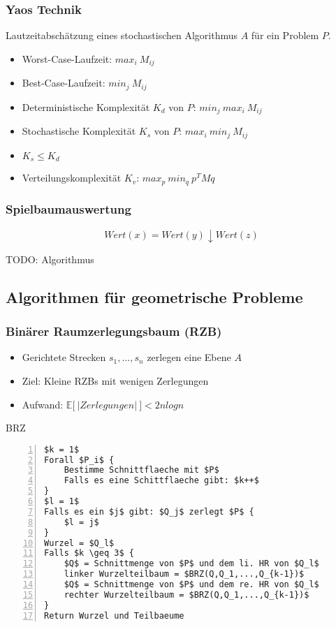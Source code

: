 \subsubsection{Yaos Technik}
Lautzeitabschätzung eines stochastischen Algorithmus \(A\) für ein Problem \(P\).
\begin{itemize}
	\item Worst-Case-Laufzeit: \(max_i~M_{ij}\)
	\item Best-Case-Laufzeit: \(min_j~M_{ij}\)
	\item Deterministische Komplexität \(K_d\) von \(P\): \(min_j~max_i~M_{ij}\)
	\item Stochastische Komplexität \(K_s\) von \(P\): \(max_i~min_j~M_{ij}\)
	\item \(K_s \leq K_d\) 
	\item Verteilungskomplexität \(K_v\): \(max_p~min_q~p^TMq\)
\end{itemize}

\subsubsection{Spielbaumauswertung}
\[Wert(x) = Wert(y) \downarrow Wert(z)\]

TODO: Algorithmus


\subsection{Algorithmen für geometrische Probleme}

\subsubsection{Binärer Raumzerlegungsbaum (RZB)}
\begin{itemize}
	\item Gerichtete Strecken \(s_1,...,s_n\) zerlegen eine Ebene \(A\)
	\item Ziel: Kleine RZBs mit wenigen Zerlegungen
	\item Aufwand: \(\mathbb{E} \lbrack~|Zerlegungen|~\rbrack < 2nlogn\)
\end{itemize}

\begin{minipage}{\textwidth}
BRZ
\begin{lstlisting}[frame=single,numbers=left,mathescape]
$k = 1$
Forall $P_i$ {
	Bestimme Schnittflaeche mit $P$
	Falls es eine Schittflaeche gibt: $k++$
}
$l = 1$
Falls es ein $j$ gibt: $Q_j$ zerlegt $P$ {
	$l = j$
}
Wurzel = $Q_l$
Falls $k \geq 3$ {
	$Q$ = Schnittmenge von $P$ und dem li. HR von $Q_l$
	linker Wurzelteilbaum = $BRZ(Q,Q_1,...,Q_{k-1})$
	$Q$ = Schnittmenge von $P$ und dem re. HR von $Q_l$
	rechter Wurzelteilbaum = $BRZ(Q,Q_1,...,Q_{k-1})$
}
Return Wurzel und Teilbaeume
\end{lstlisting}
\end{minipage}

